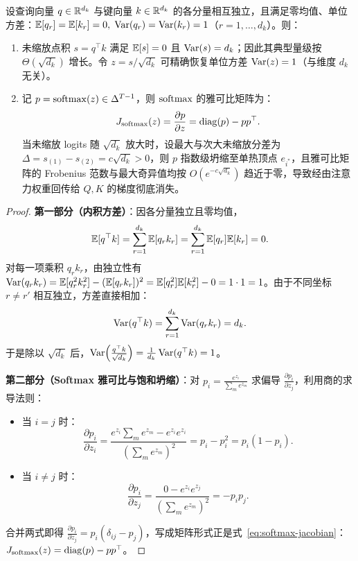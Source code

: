 \begin{thmBox}
\begin{theorem}
\label{thm:sqrt-dk}
设查询向量 $q \in \mathbb{R}^{d_k}$ 与键向量 $k \in \mathbb{R}^{d_k}$ 的各分量相互独立，且满足零均值、单位方差：$\mathbb{E}[q_r] = \mathbb{E}[k_r] = 0,\; \operatorname{Var}(q_r) = \operatorname{Var}(k_r) = 1$（$r = 1, \dots, d_k$）。则：
\begin{enumerate}
  \item 未缩放点积 $s = q^\top k$ 满足 $\mathbb{E}[s] = 0$ 且 $\operatorname{Var}(s) = d_k$；因此其典型量级按 $\Theta(\sqrt{d_k})$ 增长。令 $z = s / \sqrt{d_k}$ 可精确恢复单位方差 $\operatorname{Var}(z) = 1$（与维度 $d_k$ 无关）。
  \item 记 $p = \operatorname{softmax}(z) \in \Delta^{T-1}$，则 $\operatorname{softmax}$ 的雅可比矩阵为：
  \begin{equation}
    J_{\operatorname{softmax}}(z) = \frac{\partial p}{\partial z} = \operatorname{diag}(p) - p p^\top.
    \label{eq:softmax-jacobian}
  \end{equation}
  当未缩放 logits 随 $\sqrt{d_k}$ 放大时，设最大与次大未缩放分差为 $\Delta = s_{(1)} - s_{(2)} = c\sqrt{d_k} > 0$，则 $p$ 指数级坍缩至单热顶点 $e_{i^*}$，且雅可比矩阵的 Frobenius 范数与最大奇异值均按 $O(e^{-c\sqrt{d_k}})$ 趋近于零，导致经由注意力权重回传给 $Q, K$ 的梯度彻底消失。
\end{enumerate}
\end{theorem}
\begin{proof}
\textbf{第一部分（内积方差）}：因各分量独立且零均值，
\[
  \mathbb{E}[q^\top k] = \sum_{r=1}^{d_k} \mathbb{E}[q_r k_r] = \sum_{r=1}^{d_k} \mathbb{E}[q_r]\mathbb{E}[k_r] = 0.
\]
对每一项乘积 $q_r k_r$，由独立性有 $\operatorname{Var}(q_r k_r) = \mathbb{E}[q_r^2 k_r^2] - (\mathbb{E}[q_r k_r])^2 = \mathbb{E}[q_r^2]\mathbb{E}[k_r^2] - 0 = 1 \cdot 1 = 1$。由于不同坐标 $r \ne r'$ 相互独立，方差直接相加：
\[
  \operatorname{Var}(q^\top k) = \sum_{r=1}^{d_k} \operatorname{Var}(q_r k_r) = d_k.
\]
于是除以 $\sqrt{d_k}$ 后，$\operatorname{Var}\!\left(\frac{q^\top k}{\sqrt{d_k}}\right) = \frac{1}{d_k}\operatorname{Var}(q^\top k) = 1$。

\textbf{第二部分（Softmax 雅可比与饱和坍缩）}：对 $p_i = \frac{e^{z_i}}{\sum_m e^{z_m}}$ 求偏导 $\frac{\partial p_i}{\partial z_j}$，利用商的求导法则：
\begin{itemize}
  \item 当 $i = j$ 时：
  \[
    \frac{\partial p_i}{\partial z_i}
    = \frac{e^{z_i}\sum_m e^{z_m} - e^{z_i} e^{z_i}}{\left(\sum_m e^{z_m}\right)^2}
    = p_i - p_i^2 = p_i(1 - p_i).
  \]
  \item 当 $i \ne j$ 时：
  \[
    \frac{\partial p_i}{\partial z_j}
    = \frac{0 - e^{z_i} e^{z_j}}{\left(\sum_m e^{z_m}\right)^2}
    = -p_i p_j.
  \]
\end{itemize}
合并两式即得 $\frac{\partial p_i}{\partial z_j} = p_i(\delta_{ij} - p_j)$，写成矩阵形式正是式~\eqref{eq:softmax-jacobian}：$J_{\operatorname{softmax}}(z) = \operatorname{diag}(p) - p p^\top$。


\end{proof}
\end{thmBox}
